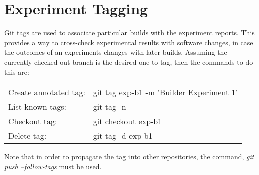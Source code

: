 \documentclass[10pt,oneside,openright, a4paper]{memoir}
\begin{document}
\chapter{Experiment Tagging}
Git tags are used to associate particular builds with the experiment
reports. This provides a way to cross-check experimental results
with software changes, in case the outcomes of an experiments changes
with later builds. Assuming the currently checked out branch is the
desired one to tag, then the commands to do this are:
\par
\begin{table}[ht]
\begin{tabular}{ll}
\centering
Create annotated tag: & git tag exp-b1 -m 'Builder Experiment 1' \\
List known tags:      & git tag -n \\
Checkout tag:         & git checkout exp-b1 \\
Delete tag:           & git tag -d exp-b1 \\
\end{tabular}
\end{table}
Note that in order to propagate the tag into other repositories, the
command, \emph{git push --follow-tags} must be used.
\end{document}
